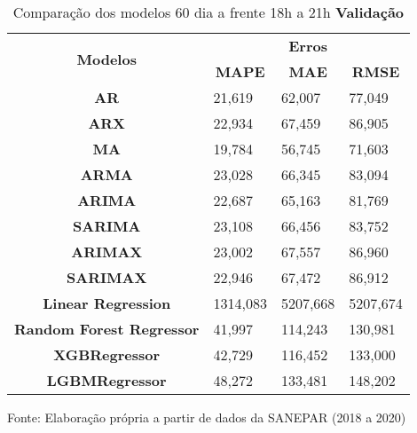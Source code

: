 \begin{table}[H]
	\centering
	\caption{Comparação dos modelos 60 dia a frente 18h a 21h \textbf{Validação} }\label{tb:60-18vld}
	\begin{tabular}{@{}clll@{}}
		\toprule
		\multirow{2}{*}{\textbf{Modelos}} & \multicolumn{3}{c}{\textbf{Erros}}                                                                       \\ \cmidrule(l){2-4} 
		& \multicolumn{1}{c}{\textbf{MAPE}} & \multicolumn{1}{c}{\textbf{MAE}} & \multicolumn{1}{c}{\textbf{RMSE}} \\ \hline
\textbf{AR}                       & 21,619                            & 62,007                           & 77,049                            \\
\textbf{ARX}                      & 22,934                            & 67,459                           & 86,905                            \\
\textbf{MA}                       & 19,784                            & 56,745                           & 71,603                            \\
\textbf{ARMA}                     & 23,028                            & 66,345                           & 83,094                            \\
\textbf{ARIMA}                    & 22,687                            & 65,163                           & 81,769                            \\
\textbf{SARIMA}                   & 23,108                            & 66,456                           & 83,752                            \\
\textbf{ARIMAX}                   & 23,002                            & 67,557                           & 86,960                            \\
\textbf{SARIMAX}                  & 22,946                            & 67,472                           & 86,912                            \\
\textbf{Linear Regression}        & 1314,083                          & 5207,668                         & 5207,674                          \\
\textbf{Random Forest Regressor}  & 41,997                            & 114,243                          & 130,981                           \\
\textbf{XGBRegressor}             & 42,729                            & 116,452                          & 133,000                           \\
\textbf{LGBMRegressor}            & 48,272                            & 133,481                          & 148,202                           \\ \bottomrule
	\end{tabular}

Fonte: Elaboração própria a partir de dados da SANEPAR (2018 a 2020)
\end{table}


